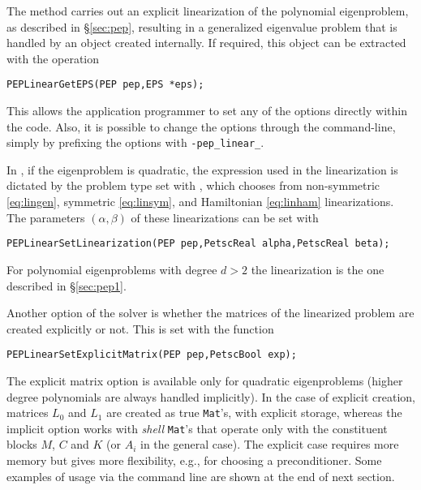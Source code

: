 The  method carries out an explicit linearization of the polynomial eigenproblem, as described in \S\ref{sec:pep}, resulting in a generalized eigenvalue problem that is handled by an  object created internally. If required, this  object can be extracted with the operation
	\begin{Verbatim}[fontsize=\small]
	PEPLinearGetEPS(PEP pep,EPS *eps);
	\end{Verbatim}
This allows the application programmer to set any of the  options directly within the code. Also, it is possible to change the  options through the command-line, simply by prefixing the  options with \texttt{-pep\_linear\_}.

In , if the eigenproblem is quadratic, the expression used in the linearization is dictated by the problem type set with , which chooses from non-symmetric \eqref{eq:lingen}, symmetric \eqref{eq:linsym}, and Hamiltonian \eqref{eq:linham} linearizations. The parameters $(\alpha,\beta)$ of these linearizations can be set with
	\begin{Verbatim}[fontsize=\small]
        PEPLinearSetLinearization(PEP pep,PetscReal alpha,PetscReal beta);
	\end{Verbatim}
For polynomial eigenproblems with degree $d>2$ the linearization is the one described in \S\ref{sec:pep1}.

Another option of the  solver is whether the matrices of the linearized problem are created explicitly or not. This is set with the function
	\begin{Verbatim}[fontsize=\small]
	PEPLinearSetExplicitMatrix(PEP pep,PetscBool exp);
	\end{Verbatim}
The explicit matrix option is available only for quadratic eigenproblems (higher degree polynomials are always handled implicitly). In the case of explicit creation, matrices $L_0$ and $L_1$ are created as true \texttt{Mat}'s, with explicit storage, whereas the implicit option works with \emph{shell} \texttt{Mat}'s that operate only with the constituent blocks $M$, $C$ and $K$ (or $A_i$ in the general case). The explicit case requires more memory but gives more flexibility, e.g., for choosing a preconditioner. Some examples of usage via the command line are shown at the end of next section.

